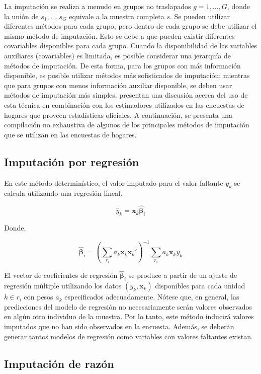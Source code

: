 \documentclass[
  12pt,
]{book}
\begin{document}
La imputación se realiza a menudo en grupos no traslapados \(g= 1, \ldots, G\), donde la unión de \(s_1, \ldots, s_G\) equivale a la muestra completa \(s\). Se pueden utilizar diferentes métodos para cada grupo, pero dentro de cada grupo se debe utilizar el mismo método de imputación. Esto se debe a que pueden existir diferentes covariables disponibles para cada grupo. Cuando la disponibilidad de las variables auxiliares (covariables) es limitada, es posible considerar una jerarquía de métodos de imputación. De esta forma, para los grupos con más información disponible, es posible utilizar métodos más sofisticados de imputación; mientras que para grupos con menos información auxiliar disponible, se deben usar métodos de imputación más simples. \citet{Sarndal_Lundstrom_2006} presentan una discusión acerca del uso de esta técnica en combinación con los estimadores utilizados en las encuestas de hogares que proveen estadísticas oficiales. A continuación, se presenta una compilación no exhaustiva de algunos de los principales métodos de imputación que se utilizan en las encuestas de hogares.

\hypertarget{imputaciuxf3n-por-regresiuxf3n}{%
\subsection{Imputación por regresión}\label{imputaciuxf3n-por-regresiuxf3n}}

En este método determinístico, el valor imputado para el valor faltante \(y_k\) se calcula utilizando una regresión lineal.

\[
\hat{y}_k = \mathbf{x}_k \hat{\boldsymbol{\beta}}_i
\]

Donde,

\[
\hat{\boldsymbol{\beta}}_i = \left(\sum_{r_i} a_k\mathbf{x}_k\mathbf{x}_k'\right)^{-1}
\sum_{r_i} a_k\mathbf{x}_ky_k
\]

El vector de coeficientes de regresión \(\hat{\boldsymbol{\beta}}_i\) se produce a partir de un ajuste de regresión múltiple utilizando los datos \((y_k, \mathbf{x}_k)\) disponibles para cada unidad \(k \in r_i\) con pesos \(a_k\) especificados adecuadamente. Nótese que, en general, las predicciones del modelo de regresión no necesariamente serán valores observados en algún otro individuo de la muestra. Por lo tanto, este método inducirá valores imputados que no han sido observados en la encuesta. Además, se deberán generar tantos modelos de regresión como variables con valores faltantes existan.

\hypertarget{imputaciuxf3n-de-razuxf3n}{%
\subsection{Imputación de razón}\label{imputaciuxf3n-de-razuxf3n}}
\end{document}
